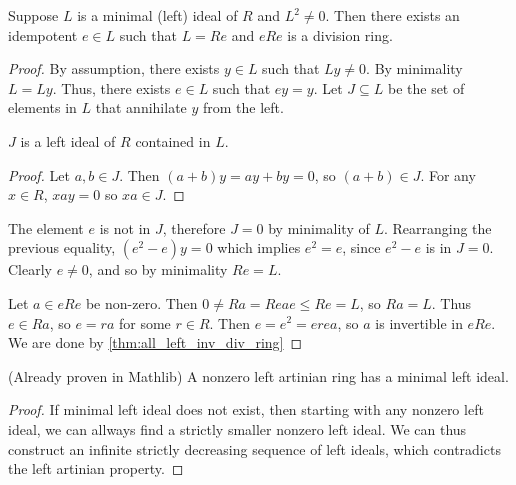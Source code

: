 \begin{theorem}
  \label{thm:brauer_lemma}
  \leanok
  Suppose $L$ is a minimal (left) ideal of $R$ and $L^2 \neq 0$. Then there exists an idempotent $e \in L$ such that $L = Re$ and $eRe$ is a division ring.
\end{theorem}
\begin{proof}
  \leanok
  By assumption, there exists $y \in L$ such that $Ly \neq 0$. By minimality $L = Ly$. Thus, there exists $e \in L$ such that $e y = y$. Let $J \subseteq L$ be the set of elements in $L$ that annihilate $y$ from the left.
  \begin{claim}
    $J$ is a left ideal of $R$ contained in $L$.
  \end{claim}
  \begin{proof}
    \leanok
    Let $a, b \in J$. Then $(a + b) y = a y + b y = 0$, so $(a + b) \in J$. For any $x \in R$, $x a y = 0$ so $xa \in J$.
  \end{proof}
  The element $e$ is not in $J$, therefore $J = 0$ by minimality of $L$.
  Rearranging the previous equality, $(e^2 - e) y = 0$ which implies $e^2 = e$, since $e^2 - e$ is in $J = 0$. Clearly $e \neq 0$, and so by minimality $Re = L$.

  Let $a \in eRe$ be non-zero. Then $0 \neq Ra = Reae \leq Re = L$, so $Ra = L$. Thus $e \in Ra$, so $e = r a$ for some $r \in R$. Then $e = e^2 = e r e a$, so $a$ is invertible in $eRe$. We are done by \ref{thm:all_left_inv_div_ring}
\end{proof}

\begin{theorem}
  \label{thm:artinian_has_minimal_left_ideal}
  \leanok
  (Already proven in Mathlib) A nonzero left artinian ring has a minimal left ideal.
\end{theorem}
\begin{proof}
  \leanok
  If minimal left ideal does not exist, then starting with any nonzero left ideal, we can allways find a strictly smaller nonzero left ideal. We can thus construct an infinite strictly decreasing sequence of left ideals, which contradicts the left artinian property.
\end{proof}

